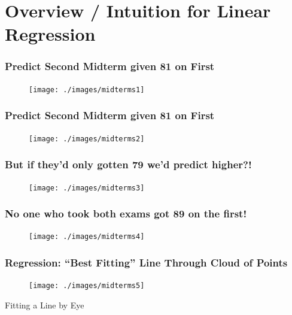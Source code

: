 
\section{Overview / Intuition for Linear Regression}
\begin{frame}
\frametitle{Predict Second Midterm given 81 on First}
\begin{figure}
	\texttt{[image: ./images/midterms1]}
\end{figure}
\end{frame}
\begin{frame}
\frametitle{Predict Second Midterm given 81 on First}
\begin{figure}
	\texttt{[image: ./images/midterms2]}
\end{figure}
\end{frame}
\begin{frame}
\frametitle{But if they'd only gotten 79 we'd predict higher?!}
\begin{figure}
	\texttt{[image: ./images/midterms3]}
\end{figure}
\end{frame}
\begin{frame}
\frametitle{No one who took both exams got 89 on the first!}
\begin{figure}
	\texttt{[image: ./images/midterms4]}
\end{figure}
\end{frame}
\begin{frame}
\frametitle{Regression: ``Best Fitting'' Line Through Cloud of Points}
\begin{figure}
	\texttt{[image: ./images/midterms5]}
\end{figure}
\end{frame}

\begin{frame}

\centering \Huge Fitting a Line by Eye


\end{frame}

